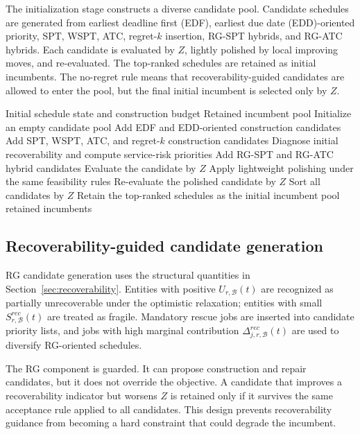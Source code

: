 \documentclass[a4paper,fleqn]{cas-sc}
\begin{document}
The initialization stage constructs a diverse candidate pool. Candidate schedules are generated from earliest deadline first (EDF), earliest due date (EDD)-oriented priority, SPT, WSPT, ATC, regret-\(k\) insertion, RG-SPT hybrids, and RG-ATC hybrids. Each candidate is evaluated by \(Z\), lightly polished by local improving moves, and re-evaluated. The top-ranked schedules are retained as initial incumbents. The no-regret rule means that recoverability-guided candidates are allowed to enter the pool, but the final initial incumbent is selected only by \(Z\).

\begin{algorithm}[!t]
\caption{No-regret multi-start initialization}
\label{alg:multistart}
\begin{algorithmic}[1]
\Require Initial schedule state and construction budget
\Ensure Retained incumbent pool
\State Initialize an empty candidate pool
\State Add EDF and EDD-oriented construction candidates
\State Add SPT, WSPT, ATC, and regret-\(k\) construction candidates
\State Diagnose initial recoverability and compute service-risk priorities
\State Add RG-SPT and RG-ATC hybrid candidates
    \State Evaluate the candidate by \(Z\)
    \State Apply lightweight polishing under the same feasibility rules
    \State Re-evaluate the polished candidate by \(Z\)
\EndFor
\State Sort all candidates by \(Z\)
\State Retain the top-ranked schedules as the initial incumbent pool
\State \Return retained incumbents
\end{algorithmic}
\end{algorithm}

\subsection{Recoverability-guided candidate generation}
\label{sec:rg_candidate_generation}

RG candidate generation uses the structural quantities in Section~\ref{sec:recoverability}. Entities with positive \(U_{r,\mathcal B}(t)\) are recognized as partially unrecoverable under the optimistic relaxation; entities with small \(S_{r,\mathcal B}^{rec}(t)\) are treated as fragile. Mandatory rescue jobs are inserted into candidate priority lists, and jobs with high marginal contribution \(\Delta_{j,r,\mathcal B}^{rec}(t)\) are used to diversify RG-oriented schedules.

The RG component is guarded. It can propose construction and repair candidates, but it does not override the objective. A candidate that improves a recoverability indicator but worsens \(Z\) is retained only if it survives the same acceptance rule applied to all candidates. This design prevents recoverability guidance from becoming a hard constraint that could degrade the incumbent.
\end{document}

